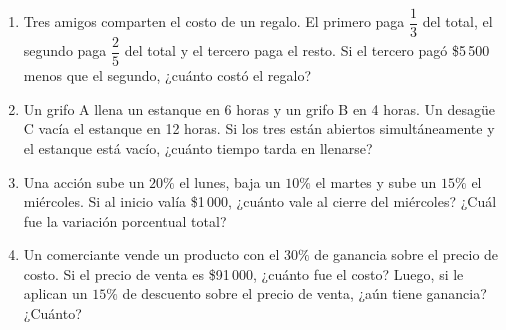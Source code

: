 \documentclass[11pt, letterpaper]{article}
\newcommand{\seccionheader}[2]{%
  \vspace{1.6em}
  \noindent{\Large\bfseries\color{#1} #2}\par
  \vspace{0.4em}{\noindent\color{#1}\rule{\linewidth}{0.8pt}}
  \vspace{1.0em}}
\begin{document}
\begin{enumerate}[label=\textbf{\arabic*.}, leftmargin=*, resume]

\item Tres amigos comparten el costo de un regalo. El primero paga $\dfrac{1}{3}$ del total, el segundo paga $\dfrac{2}{5}$ del total y el tercero paga el resto. Si el tercero pag\'o \$5\,500 menos que el segundo, ¿cu\'anto cost\'o el regalo?

\item Un grifo A llena un estanque en 6 horas y un grifo B en 4 horas. Un desag\"ue C vac\'ia el estanque en 12 horas. Si los tres est\'an abiertos simult\'aneamente y el estanque est\'a vac\'io, ¿cu\'anto tiempo tarda en llenarse?

\item Una acci\'on sube un $20\%$ el lunes, baja un $10\%$ el martes y sube un $15\%$ el mi\'ercoles. Si al inicio val\'ia \$1\,000, ¿cu\'anto vale al cierre del mi\'ercoles? ¿Cu\'al fue la variaci\'on porcentual total?

\item Un comerciante vende un producto con el $30\%$ de ganancia sobre el precio de costo. Si el precio de venta es \$91\,000, ¿cu\'anto fue el costo? Luego, si le aplican un $15\%$ de descuento sobre el precio de venta, ¿a\'un tiene ganancia? ¿Cu\'anto?

\end{enumerate}
\clearpage
\seccionheader{blockb}{Ejercicios tipo PAES}
\label{sec:paes}
\end{document}
